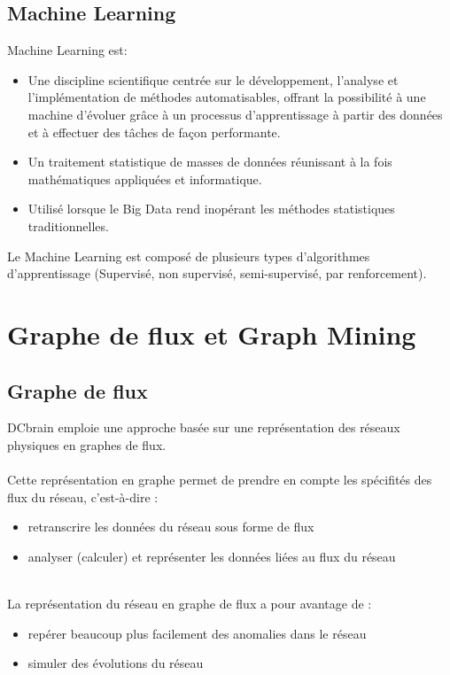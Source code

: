 	\subsection{Machine Learning}
	\begin{frame}
 
\begin{block}{Machine Learning est:}
	\begin{itemize}	
	 \item Une discipline scientifique centrée sur le développement, l’analyse et l’implémentation de méthodes automatisables, offrant la possibilité à une machine d’évoluer grâce à un processus d’apprentissage à partir des données et à effectuer des tâches de façon performante.
	 \item Un traitement statistique de masses de données réunissant à la fois mathématiques appliquées et informatique.
	 \item Utilisé lorsque le Big Data rend inopérant les méthodes statistiques traditionnelles.
	\end{itemize}
\end{block}
Le Machine Learning est composé de plusieurs types d'algorithmes d’apprentissage (Supervisé, non supervisé, semi-supervisé, par renforcement).
	\end{frame}
	
	\section{Graphe de flux et Graph Mining}
	\subsection{Graphe de flux}
	\begin{frame}
		DCbrain emploie une approche basée sur une représentation des réseaux physiques en graphes de flux.\\~\\
		\pause
		Cette représentation en graphe permet de prendre en compte les spécifités des flux du réseau, c'est-à-dire :
		\begin{itemize}
		\pause
		\item retranscrire les données du réseau sous forme de flux
		\pause
		\item analyser (calculer) et représenter les données liées au flux du réseau
		\end{itemize}
		~\\
		\pause
		La représentation du réseau en graphe de flux a pour avantage de : 
		\begin{itemize}
		\pause
		\item repérer beaucoup plus facilement des anomalies dans le réseau
		\pause
		\item simuler des évolutions du réseau
		\end{itemize}
	\end{frame}
	
